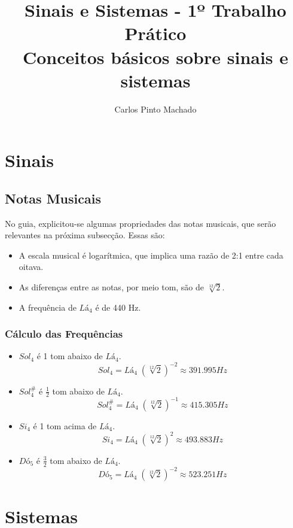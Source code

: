 \documentclass[12pt,a4paper]{article}
\author{Carlos Pinto Machado}
\title{
	Sinais e Sistemas - 1º Trabalho Prático \\
	Conceitos básicos sobre sinais e sistemas
}
\begin{document}
\maketitle

\tableofcontents

\newpage

\section{Sinais}
\subsection{Notas Musicais}
No guia, explicitou-se algumas propriedades das notas musicais, que serão relevantes na próxima subsecção.
Essas são:

\begin{itemize}
\item A escala musical é logarítmica, que implica uma razão de 2:1 entre cada oitava.
\item As diferenças entre as notas, por meio tom, são de $\sqrt[12]{2}$.
\item A frequência de $Lá_4$ é de 440 Hz.
\end{itemize}

\subsubsection{Cálculo das Frequências}
\begin{itemize}
\item $Sol_4$ é 1 tom abaixo de $Lá_4$.	
	\begin{equation}
		Sol_4 = Lá_4 \; (\sqrt[12]{2})^{-2} \approx 391.995 Hz
	\end{equation}
	
\item $Sol_4^\#$ é $\frac{1}{2}$ tom abaixo de $Lá_4$.	
	\begin{equation}
		Sol_4^\# = Lá_4 \; (\sqrt[12]{2})^{-1} \approx 415.305 Hz
	\end{equation}
	
\item $Si_4$ é 1 tom acima de $Lá_4$.	
	\begin{equation}
		Si_4 = Lá_4 \; (\sqrt[12]{2})^2 \approx 493.883 Hz
	\end{equation}
	
\item $Dó_5$ é $\frac{3}{2}$ tom abaixo de $Lá_4$.	
	\begin{equation}
		Dó_5 = Lá_4 \; (\sqrt[12]{2})^{-2} \approx 523.251 Hz
	\end{equation}
\end{itemize}

\section{Sistemas}
\end{document}

